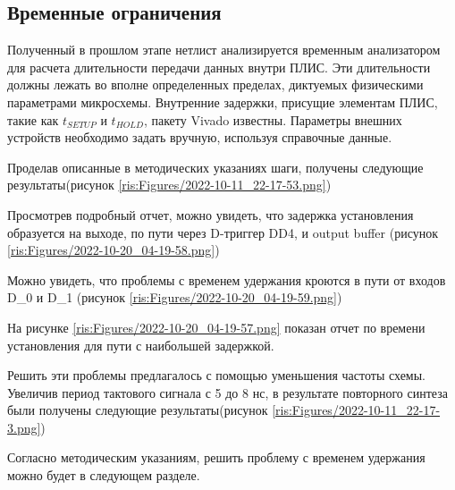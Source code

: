 \begin{sloppypar}
\subsection{Временные ограничения} %

Полученный в прошлом этапе нетлист анализируется временным анализатором для расчета длительности передачи данных внутри ПЛИС. Эти длительности должны лежать во вполне определенных пределах, диктуемых физическими параметрами микросхемы. Внутренние задержки, присущие элементам ПЛИС, такие как \begin{math}t_{SETUP}\end{math}  и \begin{math}t_{HOLD}\end{math}, пакету Vivado известны. Параметры внешних устройств необходимо задать вручную, используя справочные данные.

Проделав описанные в методических указаниях шаги, получены следующие результаты(рисунок \ref{ris:Figures/2022-10-11_22-17-53.png})

Просмотрев подробный отчет, можно увидеть, что задержка установления образуется на выходе, по пути через D-триггер DD4, и output buffer (рисунок \ref{ris:Figures/2022-10-20_04-19-58.png})

Можно увидеть, что проблемы с временем удержания кроются в пути от входов D\_0 и D\_1 (рисунок \ref{ris:Figures/2022-10-20_04-19-59.png})

На рисунке \ref{ris:Figures/2022-10-20_04-19-57.png} показан отчет по времени установления для пути с наибольшей задержкой.

Решить эти проблемы предлагалось с помощью уменьшения частоты схемы. Увеличив период тактового сигнала с 5 до 8 нс, в результате повторного синтеза были получены следующие результаты(рисунок \ref{ris:Figures/2022-10-11_22-17-3.png})




Согласно методическим указаниям, решить проблему с временем удержания можно будет в следующем разделе.


\end{sloppypar}
